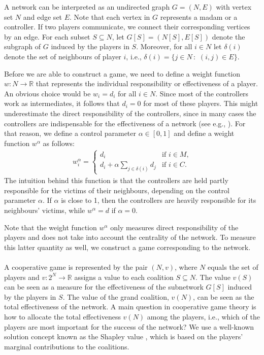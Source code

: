 \documentclass[10p]{article}
\theoremstyle{definition}
\theoremstyle{definition}
\begin{document}
A network can be interpreted as an undirected graph $G = (N,E)$ with vertex set $N$ and edge set $E$. Note that each vertex in $G$ represents a madam or a controller. If two players communicate, we connect their corresponding vertices by an edge. For each subset $S \subseteq N$, let $G[S] = (N[S], E[S])$ denote the subgraph of $G$ induced by the players in $S$. Moreover, for all $i \in N$ let $\delta(i)$ denote the set of neighbours of player $i$, i.e., $\delta(i) = \{ j \in N \, : \, \, (i,j) \in E\}$.

Before we are able to construct a game, we need to define a weight function $w : N \rightarrow \mathbb{R}$ that represents the individual responsibility or effectiveness of a player. An obvious choice would be $w_i = d_i$ for all $i \in N$. Since most of the controllers work as intermediates, it follows that $d_i = 0$ for most of these players. This might underestimate the direct responsibility of the controllers, since in many cases the controllers are indispensable for the effectiveness of a network (see e.g., \cite{mancuso2014not}). For that reason, we define a control parameter $\alpha \in [0,1]$ and define a weight function $w^\alpha$ as follows:
\begin{align*}
    w^\alpha_i = \begin{cases} d_i & \text{if $i \in M$,} \\d_i + 
    \alpha \sum_{j \in \delta(i)}d_j & \text{if $i \in C$.}
    \end{cases}
\end{align*}
The intuition behind this function is that the controllers are held partly responsible for the victims of their neighbours, depending on the control parameter $\alpha$. If $\alpha$ is close to 1, then the controllers are heavily responsible for its neighbours' victims, while $w^\alpha = d$ if $\alpha = 0$.

Note that the weight function $w^\alpha$ only measures direct responsibility of the players and does not take into account the centrality of the network. To measure this latter quantity as well, we construct a game corresponding to the network.\\ \\
A cooperative game is represented by the pair $(N,v)$, where $N$ equals the set of players and $v : 2^N \rightarrow \mathbb{R}$ assigns a value to each coalition $S \subseteq N$. The value $v(S)$ can be seen as a measure for the effectiveness of the subnetwork $G[S]$ induced by the players in $S$. The value of the grand coalition, $v(N)$, can be seen as the total effectiveness of the network. A main question in cooperative game theory is how to allocate the total effectiveness $v(N)$ among the players, i.e., which of the players are most important for the success of the network? We use a well-known solution concept known as the Shapley value \cite{shapley1953value}, which is based on the players' marginal contributions to the coalitions.
\end{document}
